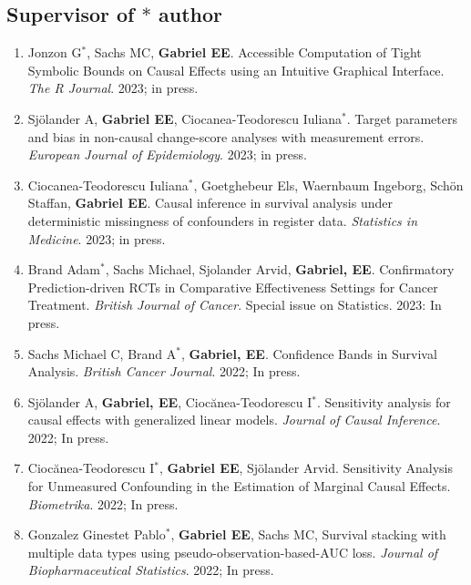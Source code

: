 \documentclass[12pt]{article}
\begin{document}
\subsection*{Supervisor of $*$ author}
\begin{enumerate}

\item Jonzon G$^*$, Sachs MC, \textbf{Gabriel EE}. Accessible Computation of Tight Symbolic Bounds on Causal Effects using an Intuitive Graphical Interface. \emph{The R Journal}. 2023; in press.

\item Sjölander A, \textbf{Gabriel EE}, Ciocanea-Teodorescu Iuliana$^*$. Target parameters and bias in non-causal change-score analyses with measurement errors. \emph{ European Journal of Epidemiology}. 2023; in press.

\item Ciocanea-Teodorescu Iuliana$^*$, Goetghebeur Els,   Waernbaum Ingeborg, Schön Staffan, \textbf{Gabriel EE}. Causal inference in survival analysis under deterministic missingness of confounders in register data. \emph{Statistics in Medicine}. 2023; in press.

\item Brand Adam$^*$, Sachs Michael, Sjolander Arvid,  \textbf{Gabriel, EE}. Confirmatory Prediction-driven RCTs in Comparative Effectiveness Settings for Cancer Treatment. \emph{British Journal of Cancer}. Special issue on Statistics. 2023: In press.

\item Sachs Michael C, Brand A$^*$, \textbf{Gabriel, EE}. Confidence Bands in Survival Analysis. \emph{British Cancer Journal}. 2022; In press.

\item Sjölander A,  \textbf{Gabriel, EE},  Cioc\u{a}nea-Teodorescu I$^*$. Sensitivity analysis for causal effects with generalized linear models. \emph{Journal of Causal Inference}. 2022; In press.

\item Cioc\u{a}nea-Teodorescu I$^*$, \textbf{Gabriel EE}, Sjölander Arvid. Sensitivity Analysis for Unmeasured Confounding in the Estimation of Marginal Causal Effects. \emph{Biometrika}. 2022; In press.

\item Gonzalez Ginestet Pablo$^*$, \textbf{Gabriel EE}, Sachs MC, Survival stacking with multiple data types using pseudo-observation-based-AUC loss.  \emph{Journal of Biopharmaceutical Statistics}. 2022; In press.


\end{enumerate}
\end{document}
